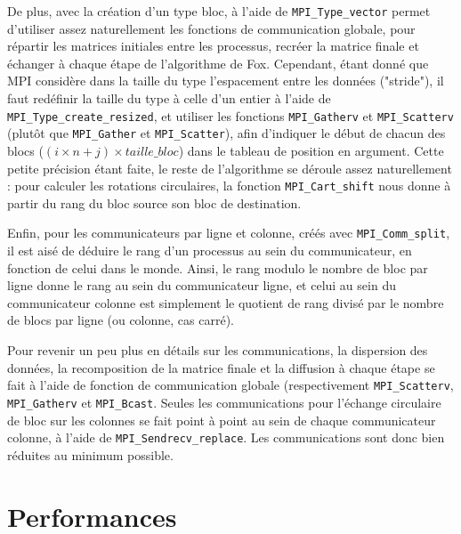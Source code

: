 \documentclass[a4paper,11pt]{article}
\begin{document}
De plus, avec la création d'un type bloc, à l'aide de \texttt{MPI\_Type\_vector} permet d'utiliser assez naturellement les fonctions de communication globale, pour répartir les matrices initiales entre les processus, recréer la matrice finale et échanger à chaque étape de l'algorithme de Fox.
Cependant, étant donné que MPI considère dans la taille du type l'espacement entre les données ("stride"), il faut redéfinir la taille du type à celle d'un entier à l'aide de \texttt{MPI\_Type\_create\_resized}, et utiliser  les fonctions \texttt{MPI\_Gatherv} et \texttt{MPI\_Scatterv} (plutôt que \texttt{MPI\_Gather} et \texttt{MPI\_Scatter}), afin d'indiquer le début de chacun des blocs ($(i \times n + j) \times \mathit{taille\_bloc}$) dans le tableau de position en argument.
Cette petite précision étant faite, le reste de l'algorithme se déroule assez naturellement : pour calculer les rotations circulaires, la fonction \texttt{MPI\_Cart\_shift} nous donne à partir du rang du bloc source son bloc de destination.

Enfin, pour les communicateurs par ligne et colonne, créés avec \texttt{MPI\_Comm\_split}, il est aisé de déduire le rang d'un processus au sein du communicateur, en fonction de celui dans le monde.
Ainsi, le rang modulo le nombre de bloc par ligne donne le rang au sein du communicateur ligne, et celui au sein du communicateur colonne est simplement le quotient de rang divisé par le nombre de blocs par ligne (ou colonne, cas carré).

Pour revenir un peu plus en détails sur les communications, la dispersion des données, la recomposition de la matrice finale et la diffusion à chaque étape se fait à l'aide de fonction de communication globale (respectivement \texttt{MPI\_Scatterv}, \texttt{MPI\_Gatherv} et \texttt{MPI\_Bcast}.
Seules les communications pour l'échange circulaire de bloc sur les colonnes se fait point à point au sein de chaque communicateur colonne, à l'aide de \texttt{MPI\_Sendrecv\_replace}.
Les communications sont donc bien réduites au minimum possible.
 
\section{Performances}
\end{document}
